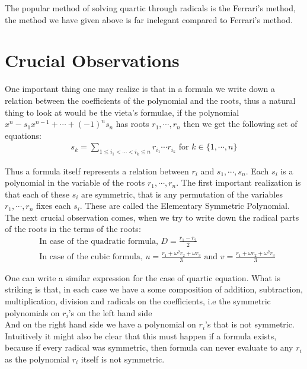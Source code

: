 \documentclass[a4paper,12pt,abstracton]{scrartcl}
\theoremstyle{dotlessP}
\theoremstyle{dotlessS}
\theoremstyle{remark}
\theoremstyle{definition}
\begin{document}
The popular method of solving quartic through radicals is the Ferrari's method, the method we have given above is far inelegant compared to Ferrari's method.

\eject

\section{Crucial Observations}

One important thing one may realize is that in a formula we write down a relation between the coefficients of the polynomial and the roots, thus a natural thing to look at would be the vieta's formulae, if the polynomial $x^n-s_1x^{n-1}+\cdots+(-1)^ns_n$ has roots $r_1,\cdots,r_n$ then we get the following set of equations:
\begin{align*}
s_k=\sum_{1\leq i_1<\cdots<i_k\leq n}{r_{i_1}\cdots r_{i_k}} \text{ for } k\in\{1,\cdots,n\}
\end{align*}

Thus a formula itself represents a relation between $r_i$ and $s_1,\cdots,s_n$. Each $s_i$ is a polynomial in the variable of the roots $r_1,\cdots,r_n$. The first important realization is that each of these $s_i$ are symmetric, that is any permutation of the variables $r_1,\cdots,r_n$ fixes each $s_i$. These are called the Elementary Symmetric Polynomial.\\

The next crucial observation comes, when we try to write down the radical parts of the roots in the terms of the roots:
\begin{align*}
&\text{In case of the quadratic formula, } D=\frac{r_1-r_2}{2}\\
&\text{In case of the cubic formula, } u=\frac{r_1+\omega^2 r_2+\omega r_3}{3} \text{ and } v=\frac{r_1+\omega r_2+\omega^2 r_3}{3}
\end{align*}

One can write a similar expression for the case of quartic equation. What is striking is that, in each case we have a some composition of addition, subtraction, multiplication, division and radicals on the coefficients, i.e the symmetric polynomials on $r_i$'s on the left hand side\\
And on the right hand side we have a polynomial on $r_i$'s that is not symmetric. Intuitively it might also be clear that this must happen if a formula exists, because if every radical was symmetric, then formula can never evaluate to any $r_i$ as the polynomial $r_i$ itself is not symmetric.\\
\end{document}
